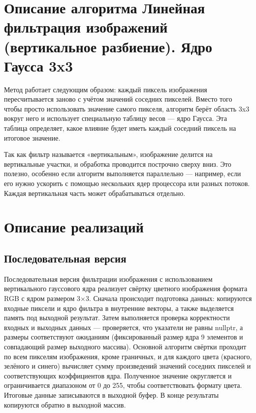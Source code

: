 \documentclass[12pt]{article}
\begin{document}
\newpage

\section*{Описание алгоритма Линейная фильтрация изображений (вертикальное разбиение). Ядро Гаусса 3x3}

Метод работает следующим образом: каждый пиксель изображения пересчитывается заново с учётом значений соседних пикселей. Вместо того чтобы просто использовать значение самого пикселя, алгоритм берёт область 3x3 вокруг него и использует специальную таблицу весов — ядро Гаусса. Эта таблица определяет, какое влияние будет иметь каждый соседний пиксель на итоговое значение.

Так как фильтр называется «вертикальным», изображение делится на вертикальные участки, и обработка проводится построчно сверху вниз. Это полезно, особенно если алгоритм выполняется параллельно — например, если его нужно ускорить с помощью нескольких ядер процессора или разных потоков. Каждая вертикальная часть может обрабатываться отдельно.


\section{Описание реализаций}
\subsection{Последовательная версия}

Последовательная версия фильтрации изображения с использованием вертикального гауссового ядра реализует свёртку цветного изображения формата RGB с ядром размером 3×3. Сначала происходит подготовка данных: копируются входные пиксели и ядро фильтра в внутренние векторы, а также выделяется память под выходной результат. Затем выполняется проверка корректности входных и выходных данных — проверяется, что указатели не равны nullptr, а размеры соответствуют ожиданиям (фиксированный размер ядра 9 элементов и совпадающий размер выходного массива). Основной алгоритм свёртки проходит по всем пикселям изображения, кроме граничных, и для каждого цвета (красного, зелёного и синего) вычисляет сумму произведений значений соседних пикселей и соответствующих коэффициентов ядра. Полученное значение округляется и ограничивается диапазоном от 0 до 255, чтобы соответствовать формату цвета. Итоговые данные записываются в выходной буфер. В конце результаты копируются обратно в выходной массив.
\end{document}
